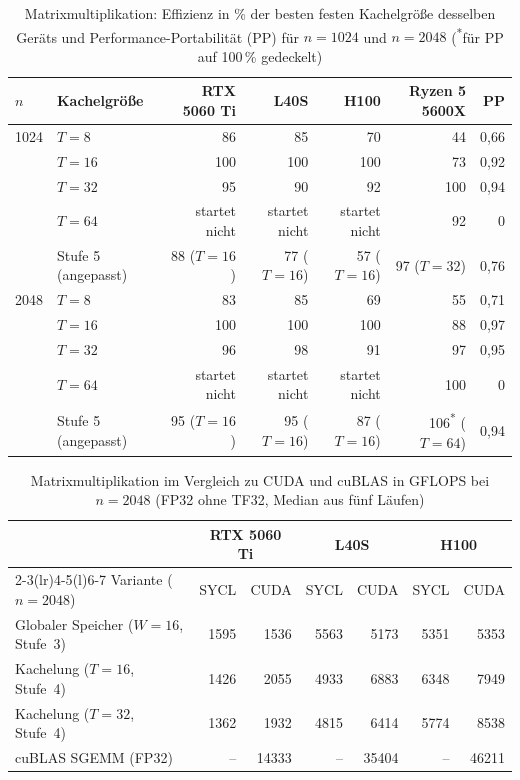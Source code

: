 \documentclass[12pt,a4paper]{article}
\begin{document}
\begin{table}[H]
\centering
\footnotesize
\setlength{\tabcolsep}{4.5pt}
\caption[Matrixmultiplikation: Effizienz je Kachelgröße und PP]{Matrixmultiplikation: Effizienz in \% der besten festen Kachelgröße desselben Geräts und Performance-Portabilität (PP) für $n = 1024$ und $n = 2048$ (\textsuperscript{*}für PP auf 100\,\% gedeckelt)}
\label{tab:kacheln}
\begin{tabular}{@{}llrrrrr@{}}
\toprule
$n$ & Kachelgröße & RTX 5060 Ti & L40S & H100 & Ryzen 5 5600X & PP \\
\midrule
1024 & $T = 8$  & 86  & 85  & 70  & 44  & 0,66 \\
     & $T = 16$ & 100 & 100 & 100 & 73  & 0,92 \\
     & $T = 32$ & 95  & 90  & 92  & 100 & 0,94 \\
     & $T = 64$ & startet nicht & startet nicht & startet nicht & 92 & 0 \\
     & Stufe 5 (angepasst) & 88 ($T{=}16$) & 77 ($T{=}16$) & 57 ($T{=}16$) & 97 ($T{=}32$) & 0,76 \\
\midrule
2048 & $T = 8$  & 83  & 85  & 69  & 55  & 0,71 \\
     & $T = 16$ & 100 & 100 & 100 & 88  & 0,97 \\
     & $T = 32$ & 96  & 98  & 91  & 97  & 0,95 \\
     & $T = 64$ & startet nicht & startet nicht & startet nicht & 100 & 0 \\
     & Stufe 5 (angepasst) & 95 ($T{=}16$) & 95 ($T{=}16$) & 87 ($T{=}16$) & 106\textsuperscript{*} ($T{=}64$) & 0,94 \\
\bottomrule
\end{tabular}
\end{table}

\begin{table}[H]
\centering
\footnotesize
\setlength{\tabcolsep}{4pt}
\caption[Matrixmultiplikation im Vergleich zu CUDA und cuBLAS]{Matrixmultiplikation im Vergleich zu CUDA und cuBLAS in GFLOPS bei $n = 2048$ (FP32 ohne TF32, Median aus fünf Läufen)}
\label{tab:matmul_cuda}
\begin{tabular}{@{}l*{6}{r}@{}}
\toprule
 & \multicolumn{2}{c}{RTX 5060 Ti} & \multicolumn{2}{c}{L40S} & \multicolumn{2}{c}{H100} \\
\cmidrule(lr){2-3}\cmidrule(lr){4-5}\cmidrule(l){6-7}
Variante ($n = 2048$) & SYCL & CUDA & SYCL & CUDA & SYCL & CUDA \\
\midrule
Globaler Speicher ($W = 16$, Stufe~3) & 1595 & 1536  & 5563 & 5173  & 5351 & 5353  \\
Kachelung ($T = 16$, Stufe~4)         & 1426 & 2055  & 4933 & 6883  & 6348 & 7949  \\
Kachelung ($T = 32$, Stufe~4)         & 1362 & 1932  & 4815 & 6414  & 5774 & 8538  \\
cuBLAS SGEMM (FP32)                   & --   & 14333 & --   & 35404 & --   & 46211 \\
\bottomrule
\end{tabular}
\end{table}
\end{document}
